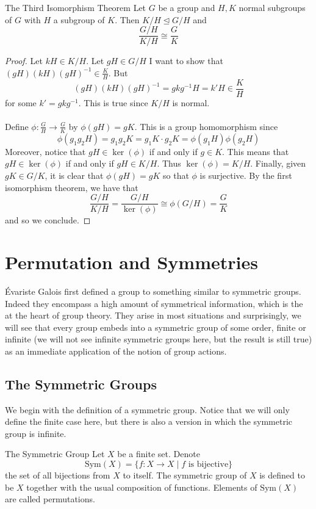 \documentclass[a4paper]{article}
\begin{document}
\begin{thm}{The Third Isomorphism Theorem}{} Let $G$ be a group and $H,K$ normal subgroups of $G$ with $H$ a subgroup of $K$. Then $K/H\trianglelefteq G/H$ and $$\frac{G/H}{K/H}\cong\frac{G}{K}$$ \tcbline
\begin{proof}
Let $kH\in K/H$. Let $gH\in G/H$ I want to show that $(gH)(kH)(gH)^{-1}\in\frac{K}{H}$. But $$(gH)(kH)(gH)^{-1}=gkg^{-1}H=k'H\in\frac{K}{H}$$ for some $k'=gkg^{-1}$. This is true since $K/H$ is normal. \\~\\

Define $\phi:\frac{G}{H}\to\frac{G}{K}$ by $\phi(gH)=gK$. This is a group homomorphism since $$\phi(g_1g_2H)=g_1g_2K=g_1K\cdot g_2K=\phi(g_1H)\phi(g_2H)$$ Moreover, notice that $gH\in\ker(\phi)$ if and only if $g\in K$. This means that $gH\in\ker(\phi)$ if and only if $gH\in K/H$. Thus $\ker(\phi)=K/H$. Finally, given $gK\in G/K$, it is clear that $\phi(gH)=gK$ so that $\phi$ is surjective. By the first isomorphism theorem, we have that $$\frac{G/H}{K/H}=\frac{G/H}{\ker(\phi)}\cong\phi(G/H)=\frac{G}{K}$$ and so we conclude. 
\end{proof}
\end{thm}

\pagebreak
\section{Permutation and Symmetries}
Évariste Galois first defined a group to something similar to symmetric groups. Indeed they encompass a high amount of symmetrical information, which is the at the heart of group theory. They arise in most situations and surprisingly, we will see that every group embeds into a symmetric group of some order, finite or infinite (we will not see infinite symmetric groups here, but the result is still true) as an immediate application of the notion of group actions. 

\subsection{The Symmetric Groups}
We begin with the definition of a symmetric group. Notice that we will only define the finite case here, but there is also a version in which the symmetric group is infinite. 

\begin{defn}{The Symmetric Group}{} Let $X$ be a finite set. Denote $$\text{Sym}(X)=\{f:X\to X\;|\; f\text{ is bijective}\}$$ the set of all bijections from $X$ to itself. The symmetric group of $X$ is defined to be $X$ together with the usual composition of functions. Elements of $\text{Sym}(X)$ are called permutations. 
\end{defn}
\end{document}
